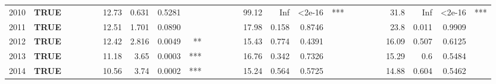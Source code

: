 \documentclass[letterpaper]{article}
\begin{document}
\begin{table}
\begin{threeparttable}
\begin{adjustbox}{max width=\textwidth}
\begin{tabular}{|p{4cm}|c|cccc|cccc|cccc|cccc|cccc|cccc|}
2010 & \multicolumn{1}{l|}{\textbf{TRUE}} & \multicolumn{1}{r|}{} & \multicolumn{1}{r|}{} & \multicolumn{1}{r|}{} &       & \multicolumn{1}{r|}{12.73} & \multicolumn{1}{r|}{0.631} & \multicolumn{1}{r|}{0.5281} &       & \multicolumn{1}{r|}{} & \multicolumn{1}{r|}{} & \multicolumn{1}{r|}{} &       & \multicolumn{1}{r|}{99.12} & \multicolumn{1}{r|}{Inf} & \multicolumn{1}{r|}{\textless2e-16} & \multicolumn{1}{r|}{***} & \multicolumn{1}{r|}{} & \multicolumn{1}{r|}{} & \multicolumn{1}{r|}{} &       & \multicolumn{1}{r|}{31.8} & \multicolumn{1}{r|}{Inf} & \multicolumn{1}{r|}{\textless2e-16} & \multicolumn{1}{r|}{***} \\
2011 & \multicolumn{1}{l|}{\textbf{TRUE}} & \multicolumn{1}{r|}{} & \multicolumn{1}{r|}{} & \multicolumn{1}{r|}{} &       & \multicolumn{1}{r|}{12.51} & \multicolumn{1}{r|}{1.701} & \multicolumn{1}{r|}{0.0890} &       & \multicolumn{1}{r|}{} & \multicolumn{1}{r|}{} & \multicolumn{1}{r|}{} &       & \multicolumn{1}{r|}{17.98} & \multicolumn{1}{r|}{0.158} & \multicolumn{1}{r|}{0.8746} &       & \multicolumn{1}{r|}{} & \multicolumn{1}{r|}{} & \multicolumn{1}{r|}{} &       & \multicolumn{1}{r|}{23.8} & \multicolumn{1}{r|}{0.011} & \multicolumn{1}{r|}{0.9909} &  \\
2012 & \multicolumn{1}{l|}{\textbf{TRUE}} & \multicolumn{1}{r|}{} & \multicolumn{1}{r|}{} & \multicolumn{1}{r|}{} &       & \multicolumn{1}{r|}{12.42} & \multicolumn{1}{r|}{2.816} & \multicolumn{1}{r|}{0.0049} & \multicolumn{1}{r|}{**} & \multicolumn{1}{r|}{} & \multicolumn{1}{r|}{} & \multicolumn{1}{r|}{} &       & \multicolumn{1}{r|}{15.43} & \multicolumn{1}{r|}{0.774} & \multicolumn{1}{r|}{0.4391} &       & \multicolumn{1}{r|}{} & \multicolumn{1}{r|}{} & \multicolumn{1}{r|}{} &       & \multicolumn{1}{r|}{16.09} & \multicolumn{1}{r|}{0.507} & \multicolumn{1}{r|}{0.6125} &  \\
2013 & \multicolumn{1}{l|}{\textbf{TRUE}} & \multicolumn{1}{r|}{} & \multicolumn{1}{r|}{} & \multicolumn{1}{r|}{} &       & \multicolumn{1}{r|}{11.18} & \multicolumn{1}{r|}{3.65} & \multicolumn{1}{r|}{0.0003} & \multicolumn{1}{r|}{***} & \multicolumn{1}{r|}{} & \multicolumn{1}{r|}{} & \multicolumn{1}{r|}{} &       & \multicolumn{1}{r|}{16.76} & \multicolumn{1}{r|}{0.342} & \multicolumn{1}{r|}{0.7326} &       & \multicolumn{1}{r|}{} & \multicolumn{1}{r|}{} & \multicolumn{1}{r|}{} &       & \multicolumn{1}{r|}{15.29} & \multicolumn{1}{r|}{0.6} & \multicolumn{1}{r|}{0.5484} &  \\
2014 & \multicolumn{1}{l|}{\textbf{TRUE}} & \multicolumn{1}{r|}{} & \multicolumn{1}{r|}{} & \multicolumn{1}{r|}{} &       & \multicolumn{1}{r|}{10.56} & \multicolumn{1}{r|}{3.74} & \multicolumn{1}{r|}{0.0002} & \multicolumn{1}{r|}{***} & \multicolumn{1}{r|}{} & \multicolumn{1}{r|}{} & \multicolumn{1}{r|}{} &       & \multicolumn{1}{r|}{15.24} & \multicolumn{1}{r|}{0.564} & \multicolumn{1}{r|}{0.5725} &       & \multicolumn{1}{r|}{} & \multicolumn{1}{r|}{} & \multicolumn{1}{r|}{} &       & \multicolumn{1}{r|}{14.88} & \multicolumn{1}{r|}{0.604} & \multicolumn{1}{r|}{0.5462} &  \\

\end{tabular}
\end{adjustbox}
\end{threeparttable}
\end{table}
\end{document}
